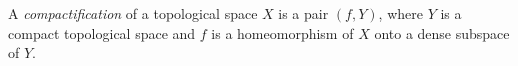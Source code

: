 A \emph{compactification} of a topological space $X$ is a pair $(f, Y)$, where $Y$ is a compact topological space and $f$ is a homeomorphism of $X$ onto a dense subspace of $Y$.

